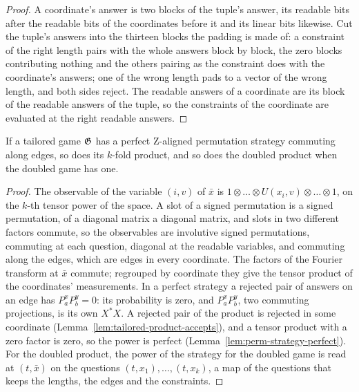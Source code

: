 \begin{proof}
\leanok
A coordinate's answer is two blocks of the tuple's answer, its readable bits after the
readable bits of the coordinates before it and its linear bits likewise. Cut the tuple's
answers into the thirteen blocks the padding is made of: a constraint of the right length
pairs with the whole answers block by block, the zero blocks contributing nothing and the
others pairing as the constraint does with the coordinate's answers; one of the wrong length
pads to a vector of the wrong length, and both sides reject. The readable answers of a coordinate are its block of the
readable answers of the tuple, so the constraints of the coordinate are evaluated at the
right readable answers.
\end{proof}

\begin{lemma}
\label{lem:tensor-power-zpc}
\leanok
If a tailored game $\mathfrak{G}$ has a perfect Z-aligned permutation strategy commuting along edges,
so does its $k$-fold product, and so does the doubled product when the doubled game has one.
\end{lemma}

\begin{proof}
\leanok
The observable of the variable $(i, v)$ of $\bar{x}$ is $1 \otimes \ldots \otimes U(x_i, v)
\otimes \ldots \otimes 1$, on the $k$-th tensor power of the space. A slot of a signed
permutation is a signed permutation, of a diagonal matrix a diagonal matrix, and slots in two
different factors commute, so the observables are involutive signed permutations, commuting at
each question, diagonal at the readable variables, and commuting along the edges, which are
edges in every coordinate. The factors of the Fourier transform at $\bar{x}$ commute; regrouped
by coordinate they give the tensor product of the coordinates' measurements. In a perfect
strategy a rejected pair of answers on an edge has $P^x_a P^y_b = 0$: its probability is zero,
and $P^x_a P^y_b$, two commuting projections, is its own $X^* X$. A rejected pair of the product
is rejected in some coordinate (Lemma~\ref{lem:tailored-product-accepts}), and a tensor product
with a zero factor is zero, so the power is perfect (Lemma~\ref{lem:perm-strategy-perfect}).
For the doubled product, the power of the strategy for the doubled game is read at $(t,
\bar{x})$ on the questions $(t, x_1), \ldots, (t, x_k)$, a map of the questions that keeps
the lengths, the edges and the constraints.
\end{proof}

